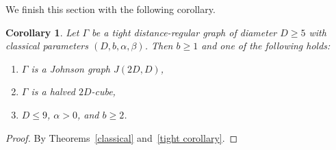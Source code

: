 \documentclass[11pt]{article}
\newtheorem{coro}[theo]{Corollary}
\theoremstyle{definition}
\numberwithin{equation}{section}
\numberwithin{equation}{section}
\begin{document}
We finish this section with the following corollary.
\begin{coro}
Let $\Gamma$ be a tight distance-regular graph of diameter $D \geqslant 5$ with classical parameters $(D, b, \alpha, \beta)$. 
Then $b \geqslant 1$ and one of the following holds:
\begin{enumerate}[\normalfont(i)]
  \item $\Gamma$ is a Johnson graph $J(2D,D)$,
  \item $\Gamma$ is a halved $2D$-cube,
  \item $D \leqslant 9$, $\alpha>0$, and $b\geqslant 2$.
\end{enumerate}
\end{coro}
\begin{proof}
By Theorems~\ref{classical} and~\ref{tight corollary}.
\end{proof}
\end{document}
